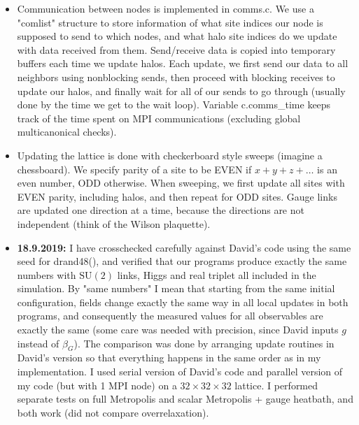 \documentclass[11pt,a4paper]{article}
\newcommand\gr[1]{\mathrm{#1}}%
\begin{document}
\begin{itemize}
	\item Communication between nodes is implemented in comms.c. We use a "comlist" structure to store information of what site indices our node is supposed to send to which nodes, and what halo site indices do we update with data received from them. Send/receive data is copied into temporary buffers each time we update halos. Each update, we first send our data to all neighbors using nonblocking sends, then proceed with blocking receives to update our halos, and finally wait for all of our sends to go through (usually done by the time we get to the wait loop). Variable c.comms\_time keeps track of the time spent on MPI communications (excluding global multicanonical checks).
	
	\item Updating the lattice is done with checkerboard style sweeps (imagine a chessboard). We specify parity of a site to be EVEN if $x + y + z + \dots $ is an even number, ODD otherwise. When sweeping, we first update all sites with EVEN parity, including halos, and then repeat for ODD sites. Gauge links are updated one direction at a time, because the directions are not independent (think of the Wilson plaquette).  
	
	\item \textbf{18.9.2019:} I have crosschecked carefully against David's code using the same seed for drand48(), and verified that our programs produce exactly the same numbers with $\gr{SU(2)}$ links, Higgs and real triplet all included in the simulation. By "same numbers" I mean that starting from the same initial configuration, fields change exactly the same way in all local updates in both programs, and consequently the measured values for all observables are exactly the same (some care was needed with precision, since David inputs $g$ instead of $\beta_G$). The comparison was done by arranging update routines in David's version so that everything happens in the same order as in my implementation. I used serial version of David's code and parallel version of my code (but with 1 MPI node) on a $32 \times 32 \times 32$ lattice. I performed separate tests on full Metropolis and scalar Metropolis + gauge heatbath, and both work (did not compare overrelaxation).

	
\end{itemize}
\end{document}

